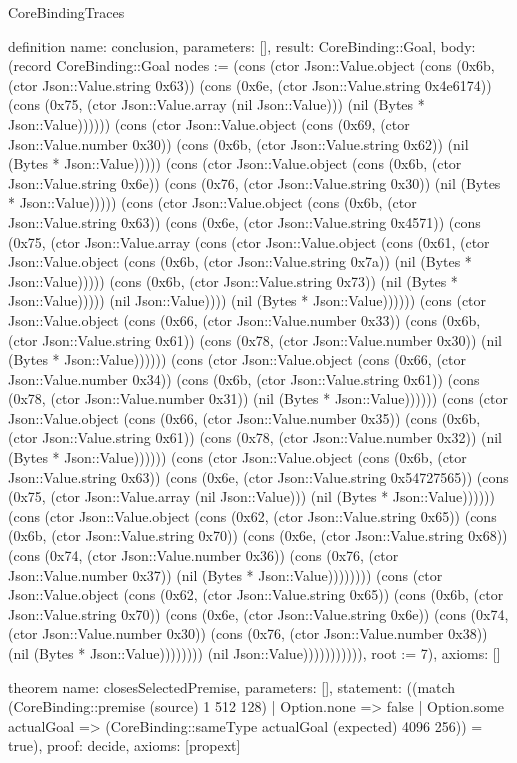 \begin{lexlean}{CoreBindingTraces}
\begin{semanticmodule}
definition{
 name: conclusion,
 parameters: [],
 result: CoreBinding::Goal,
 body: (record CoreBinding::Goal {nodes := (cons (ctor Json::Value.object (cons (0x6b, (ctor Json::Value.string 0x63)) (cons (0x6e, (ctor Json::Value.string 0x4e6174)) (cons (0x75, (ctor Json::Value.array (nil Json::Value))) (nil (Bytes * Json::Value)))))) (cons (ctor Json::Value.object (cons (0x69, (ctor Json::Value.number 0x30)) (cons (0x6b, (ctor Json::Value.string 0x62)) (nil (Bytes * Json::Value))))) (cons (ctor Json::Value.object (cons (0x6b, (ctor Json::Value.string 0x6e)) (cons (0x76, (ctor Json::Value.string 0x30)) (nil (Bytes * Json::Value))))) (cons (ctor Json::Value.object (cons (0x6b, (ctor Json::Value.string 0x63)) (cons (0x6e, (ctor Json::Value.string 0x4571)) (cons (0x75, (ctor Json::Value.array (cons (ctor Json::Value.object (cons (0x61, (ctor Json::Value.object (cons (0x6b, (ctor Json::Value.string 0x7a)) (nil (Bytes * Json::Value))))) (cons (0x6b, (ctor Json::Value.string 0x73)) (nil (Bytes * Json::Value))))) (nil Json::Value)))) (nil (Bytes * Json::Value)))))) (cons (ctor Json::Value.object (cons (0x66, (ctor Json::Value.number 0x33)) (cons (0x6b, (ctor Json::Value.string 0x61)) (cons (0x78, (ctor Json::Value.number 0x30)) (nil (Bytes * Json::Value)))))) (cons (ctor Json::Value.object (cons (0x66, (ctor Json::Value.number 0x34)) (cons (0x6b, (ctor Json::Value.string 0x61)) (cons (0x78, (ctor Json::Value.number 0x31)) (nil (Bytes * Json::Value)))))) (cons (ctor Json::Value.object (cons (0x66, (ctor Json::Value.number 0x35)) (cons (0x6b, (ctor Json::Value.string 0x61)) (cons (0x78, (ctor Json::Value.number 0x32)) (nil (Bytes * Json::Value)))))) (cons (ctor Json::Value.object (cons (0x6b, (ctor Json::Value.string 0x63)) (cons (0x6e, (ctor Json::Value.string 0x54727565)) (cons (0x75, (ctor Json::Value.array (nil Json::Value))) (nil (Bytes * Json::Value)))))) (cons (ctor Json::Value.object (cons (0x62, (ctor Json::Value.string 0x65)) (cons (0x6b, (ctor Json::Value.string 0x70)) (cons (0x6e, (ctor Json::Value.string 0x68)) (cons (0x74, (ctor Json::Value.number 0x36)) (cons (0x76, (ctor Json::Value.number 0x37)) (nil (Bytes * Json::Value)))))))) (cons (ctor Json::Value.object (cons (0x62, (ctor Json::Value.string 0x65)) (cons (0x6b, (ctor Json::Value.string 0x70)) (cons (0x6e, (ctor Json::Value.string 0x6e)) (cons (0x74, (ctor Json::Value.number 0x30)) (cons (0x76, (ctor Json::Value.number 0x38)) (nil (Bytes * Json::Value)))))))) (nil Json::Value))))))))))), root := 7}),
 axioms: []
}

theorem{
 name: closesSelectedPremise,
 parameters: [],
 statement: ((match (CoreBinding::premise (source) 1 512 128) | Option.none => false | Option.some actualGoal => (CoreBinding::sameType actualGoal (expected) 4096 256)) = true),
 proof: decide{},
 axioms: [propext]
}


\end{semanticmodule}
\end{lexlean}
